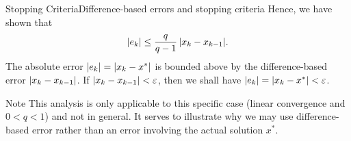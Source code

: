 \documentclass[12pt,aspectratio=169,envcountset]{beamer}
\DeclarePairedDelimiter{\abs}{\lvert}{\rvert}
\begin{document}
\begin{frame}{Stopping Criteria}{Difference-based errors and stopping criteria}
  Hence, we have shown that
  \[
    \abs{e_k} \leq \frac{q}{q - 1}\,\abs{x_k - x_{k-1}}.
  \]
  The absolute error $\abs{e_k} = \abs{x_k - x^*}$ is bounded above by the
  difference-based error $\abs{x_k - x_{k-1}}$.
  If $\abs{x_k - x_{k-1}} < \varepsilon$, then we shall have $\abs{e_k} =
  \abs{x_k - x^*} < \varepsilon$.

  \begin{block}{Note}
    This analysis is only applicable to this specific case (linear convergence
    and $0 < q < 1$) and not in general.
    It serves to illustrate why we may use difference-based error rather than an
    error involving the actual solution $x^*$.
  \end{block}
\end{frame}
\end{document}
